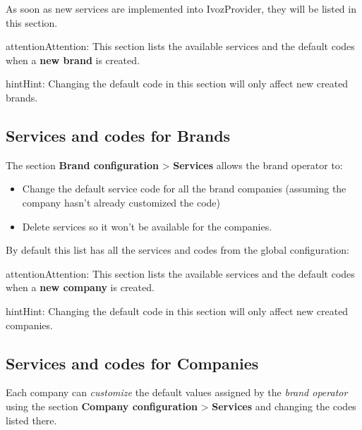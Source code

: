 \documentclass[letterpaper,10pt,english]{sphinxmanual}
\begin{document}
As soon as new services are implemented into IvozProvider, they will be listed
in this section.

\begin{notice}{attention}{Attention:}
This section lists the available services and the default codes
when a \textbf{new brand} is created.
\end{notice}

\begin{notice}{hint}{Hint:}
Changing the default code in this section will only affect new
created brands.
\end{notice}


\subsection{Services and codes for Brands}
\label{pbx_features/services:services-and-codes-for-brands}
The section \textbf{Brand configuration} \textgreater{} \textbf{Services} allows the brand operator to:
\begin{itemize}
\item {} 
Change the default service code for all the brand companies (assuming the
company hasn't already customized the code)

\item {} 
Delete services so it won't be available for the companies.

\end{itemize}

By default this list has all the services and codes from the global
configuration:

\begin{notice}{attention}{Attention:}
This section lists the available services and the default codes
when a \textbf{new company} is created.
\end{notice}

\begin{notice}{hint}{Hint:}
Changing the default code in this section will only affect new
created companies.
\end{notice}


\subsection{Services and codes for Companies}
\label{pbx_features/services:services-and-codes-for-companies}
Each company can \emph{customize} the default values assigned by the \emph{brand operator}
using the section \textbf{Company configuration} \textgreater{} \textbf{Services} and changing the codes
listed there.
\end{document}
